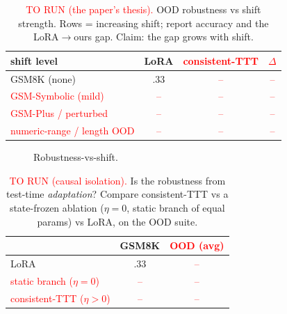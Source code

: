 \documentclass{article}       %
\begin{document}
\begin{table}[t]\centering
\caption{\textcolor{red}{TO RUN (the paper's thesis).} OOD robustness vs shift strength. Rows = increasing shift; report
accuracy and the LoRA$\to$ours gap. Claim: the gap grows with shift.}
\label{tab:ood}
\begin{tabular}{lccc}
\toprule
shift level & LoRA & \textcolor{red}{consistent-TTT} & \textcolor{red}{$\Delta$}\\
\midrule
GSM8K (none)            & .33 & \textcolor{red}{--} & \textcolor{red}{--}\\
\textcolor{red}{GSM-Symbolic (mild)}  & \textcolor{red}{--} & \textcolor{red}{--} & \textcolor{red}{--}\\
\textcolor{red}{GSM-Plus / perturbed} & \textcolor{red}{--} & \textcolor{red}{--} & \textcolor{red}{--}\\
\textcolor{red}{numeric-range / length OOD} & \textcolor{red}{--} & \textcolor{red}{--} & \textcolor{red}{--}\\
\bottomrule
\end{tabular}
\end{table}

\begin{figure}[t]\centering
{}
\caption{Robustness-vs-shift.}\label{fig:money}
\end{figure}

\begin{table}[t]\centering
\caption{\textcolor{red}{TO RUN (causal isolation).} Is the robustness from test-time \emph{adaptation}? Compare
consistent-TTT vs a state-frozen ablation ($\eta{=}0$, static branch of equal params) vs LoRA, on the OOD suite.}
\label{tab:ablate}
\begin{tabular}{lcc}
\toprule
 & GSM8K & \textcolor{red}{OOD (avg)}\\
\midrule
LoRA & .33 & \textcolor{red}{--}\\
\textcolor{red}{static branch ($\eta{=}0$)} & \textcolor{red}{--} & \textcolor{red}{--}\\
\textcolor{red}{consistent-TTT ($\eta{>}0$)} & \textcolor{red}{--} & \textcolor{red}{--}\\
\bottomrule
\end{tabular}
\end{table}
\end{document}
